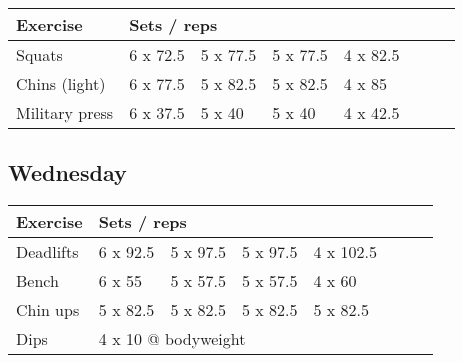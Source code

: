 \documentclass[12pt, a4paper]{article}%
\begin{document}
  \begin{tabular}{l|lllllll}
  \hspace{0.75em} \textbf{Exercise} & \multicolumn{ 7 }{l}{ \textbf{Sets / reps} } \\ \hline

            \hspace{0.75em} Squats
            & 6 x 72.5
            & 5 x 77.5
            & 5 x 77.5
            & 4 x 82.5
            & 
            & 
            & 
            \\


            \hspace{0.75em} Chins (light)
            & 6 x 77.5
            & 5 x 82.5
            & 5 x 82.5
            & 4 x 85
            & 
            & 
            & 
            \\


            \hspace{0.75em} Military press
            & 6 x 37.5
            & 5 x 40
            & 5 x 40
            & 4 x 42.5
            & 
            & 
            & 
            \\


  \end{tabular}

  \subsection*{\hspace{0.5em} Wednesday }


  \begin{tabular}{l|lllllll}
  \hspace{0.75em} \textbf{Exercise} & \multicolumn{ 7 }{l}{ \textbf{Sets / reps} } \\ \hline

            \hspace{0.75em} Deadlifts
            & 6 x 92.5
            & 5 x 97.5
            & 5 x 97.5
            & 4 x 102.5
            & 
            & 
            & 
            \\


            \hspace{0.75em} Bench
            & 6 x 55
            & 5 x 57.5
            & 5 x 57.5
            & 4 x 60
            & 
            & 
            & 
            \\


            \hspace{0.75em} Chin ups
            & 5 x 82.5
            & 5 x 82.5
            & 5 x 82.5
            & 5 x 82.5
            & 
            & 
            & 
            \\


   \hspace{0.75em} Dips &  \multicolumn{ 7 }{l}{ 4 x 10 @ bodyweight } \\
  \end{tabular}
\end{document}
